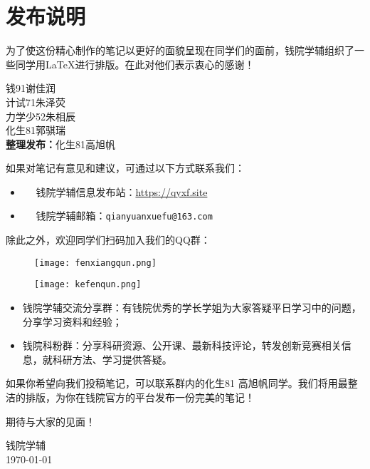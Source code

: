 \chapter*{发布说明}

为了使这份精心制作的笔记以更好的面貌呈现在同学们的面前，钱院学辅组织了一些同学用\LaTeX 进行排版。在此对他们表示衷心的感谢！
\vspace{0.5em}

\begin{tcolorbox}[title={\bfseries 参与排版成员}]
	 钱91\hspace{6pt}谢佳润\\
	 计试71\hspace{6pt}朱泽荧\\
	 力学少52\hspace{6pt}朱相辰\\	
	 化生81\hspace{6pt}郭骐瑞\\
	 \textbf{整理发布：}化生81\hspace{6pt}高旭帆
\end{tcolorbox}


如果对笔记有意见和建议，可通过以下方式联系我们：

\begin{itemize}
	\item \faInternetExplorer ~~ 钱院学辅信息发布站：\url{https://qyxf.site}
	\item \faEnvelopeOpen ~~ 钱院学辅邮箱：\texttt{qianyuanxuefu@163.com}
\end{itemize}

除此之外，欢迎同学们扫码加入我们的QQ群：

\begin{figure}[!ht]
	\centering
	\begin{minipage}[c]{0.45\textwidth}
		\centering
		\texttt{[image: fenxiangqun.png]}
	\end{minipage}%
	\quad
	\begin{minipage}[c]{0.45\textwidth}
		\centering
		\texttt{[image: kefenqun.png]}
	\end{minipage}
\end{figure}

\newpage\thispagestyle{empty}

\begin{itemize}
	\item 钱院学辅交流分享群：有钱院优秀的学长学姐为大家答疑平日学习中的问题，分享学习资料和经验；
	\item 钱院科粉群：分享科研资源、公开课、最新科技评论，转发创新竞赛相关信息，就科研方法、学习提供答疑。
\end{itemize}

如果你希望向我们投稿笔记，可以联系群内的化生81 高旭帆同学。我们将用最整洁的排版，为你在钱院官方的平台发布一份完美的笔记！

期待与大家的见面！

\begin{flushright}
	钱院学辅\\
	\today
\end{flushright}

